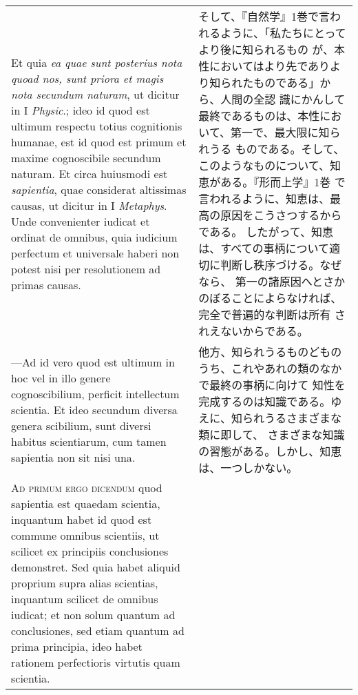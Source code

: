 \documentclass[10pt]{jsarticle} %
\begin{document}
\begin{longtable}{p{21em}p{21em}}
\\



Et quia {\itshape ea
 quae sunt posterius nota quoad nos, sunt priora et magis nota secundum
 naturam}, ut dicitur in I {\itshape Physic}.; ideo id quod est ultimum respectu
 totius cognitionis humanae, est id quod est primum et maxime
 cognoscibile secundum naturam. Et circa huiusmodi est {\itshape sapientia}, quae
 considerat altissimas causas, ut dicitur in I {\itshape Metaphys}. Unde
 convenienter iudicat et ordinat de omnibus, quia iudicium perfectum et
 universale haberi non potest nisi per resolutionem ad primas causas. 


&

そして、『自然学』1巻で言われるように、「私たちにとってより後に知られるもの
 が、本性においてはより先でありより知られたものである」から、人間の全認
 識にかんして最終であるものは、本性において、第一で、最大限に知られうる
 ものである。そして、このようなものについて、知恵がある。『形而上学』1巻
 で言われるように、知恵は、最高の原因をこうさつするからである。
したがって、知恵は、すべての事柄について適切に判断し秩序づける。なぜなら、
 第一の諸原因へとさかのぼることによらなければ、完全で普遍的な判断は所有
 されえないからである。


\\



---Ad
 id vero quod est ultimum in hoc vel in illo genere cognoscibilium,
 perficit intellectum scientia. Et ideo secundum diversa genera
 scibilium, sunt diversi habitus scientiarum, cum tamen sapientia non
 sit nisi una.

&

他方、知られうるものどものうち、これやあれの類のなかで最終の事柄に向けて
 知性を完成するのは知識である。ゆえに、知られうるさまざまな類に即して、
 さまざまな知識の習態がある。しかし、知恵は、一つしかない。


\\



{\scshape Ad primum ergo dicendum} quod sapientia
 est quaedam scientia, inquantum habet id quod est commune omnibus
 scientiis, ut scilicet ex principiis conclusiones demonstret. Sed quia
 habet aliquid proprium supra alias scientias, inquantum scilicet de
 omnibus iudicat; et non solum quantum ad conclusiones, sed etiam
 quantum ad prima principia, ideo habet rationem perfectioris virtutis
 quam scientia.

&


\end{longtable}
\end{document}
